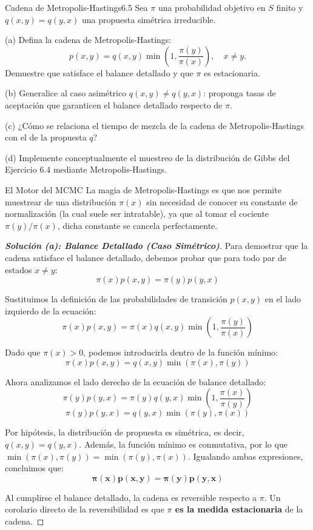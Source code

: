 \documentclass[10pt,a4paper]{article}
\begin{document}
\begin{ejercicio}{Cadena de Metropolis-Hastings}{6.5}
    Sea $\pi$ una probabilidad objetivo en $S$ finito y $q(x,y) = q(y,x)$ una propuesta simétrica irreducible.
    
    (a) Defina la cadena de Metropolis-Hastings:
    \[ p(x,y) = q(x,y) \min\left(1, \frac{\pi(y)}{\pi(x)}\right), \quad x \neq y. \]
    Demuestre que satisface el balance detallado y que $\pi$ es estacionaria.
    
    (b) Generalice al caso asimétrico $q(x,y) \neq q(y,x)$: proponga tasas de aceptación que garanticen el balance detallado respecto de $\pi$.
    
    (c) ¿Cómo se relaciona el tiempo de mezcla de la cadena de Metropolis-Hastings con el de la propuesta $q$?
    
    (d) Implemente conceptualmente el muestreo de la distribución de Gibbs del Ejercicio 6.4 mediante Metropolis-Hastings.
\end{ejercicio}

\vspace{2mm}

\begin{nota}{El Motor del MCMC}
    La magia de Metropolis-Hastings es que nos permite muestrear de una distribución $\pi(x)$ sin necesidad de conocer su constante de normalización (la cual suele ser intratable), ya que al tomar el cociente $\pi(y)/\pi(x)$, dicha constante se cancela perfectamente.
\end{nota}

\begin{proof}[\textbf{Solución (a): Balance Detallado (Caso Simétrico)}]
    Para demostrar que la cadena satisface el balance detallado, debemos probar que para todo par de estados $x \neq y$:
    \[ \pi(x) p(x,y) = \pi(y) p(y,x) \]
    
    Sustituimos la definición de las probabilidades de transición $p(x,y)$ en el lado izquierdo de la ecuación:
    \[ \pi(x) p(x,y) = \pi(x) q(x,y) \min\left(1, \frac{\pi(y)}{\pi(x)}\right) \]
    
    Dado que $\pi(x) > 0$, podemos introducirla dentro de la función mínimo:
    \[ \pi(x) p(x,y) = q(x,y) \min(\pi(x), \pi(y)) \]
    
    Ahora analizamos el lado derecho de la ecuación de balance detallado:
    \[ \pi(y) p(y,x) = \pi(y) q(y,x) \min\left(1, \frac{\pi(x)}{\pi(y)}\right) \]
    \[ \pi(y) p(y,x) = q(y,x) \min(\pi(y), \pi(x)) \]
    
    Por hipótesis, la distribución de propuesta es simétrica, es decir, $q(x,y) = q(y,x)$. Además, la función mínimo es conmutativa, por lo que $\min(\pi(x), \pi(y)) = \min(\pi(y), \pi(x))$. 
    Igualando ambas expresiones, concluimos que:
    \[ \mathbf{\pi(x) p(x,y) = \pi(y) p(y,x)} \]
    
    Al cumplirse el balance detallado, la cadena es reversible respecto a $\pi$. Un corolario directo de la reversibilidad es que \textbf{$\pi$ es la medida estacionaria} de la cadena.
\end{proof}
\end{document}
